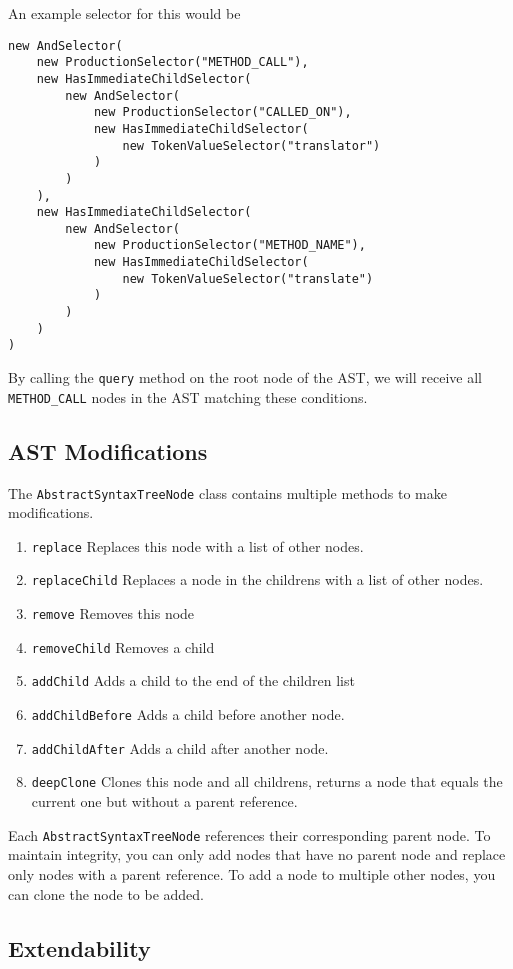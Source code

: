 An example selector for this would be

\begin{verbatim}
new AndSelector(
	new ProductionSelector("METHOD_CALL"),
	new HasImmediateChildSelector(
		new AndSelector(
			new ProductionSelector("CALLED_ON"),
			new HasImmediateChildSelector(
				new TokenValueSelector("translator")
			)
		)
	),
	new HasImmediateChildSelector(
		new AndSelector(
			new ProductionSelector("METHOD_NAME"),
			new HasImmediateChildSelector(
				new TokenValueSelector("translate")
			)
		)
	)
)
\end{verbatim}

By calling the \verb|query| method on the root node of the AST, we will receive all \verb|METHOD_CALL| nodes in the AST matching these conditions.

\subsection{AST Modifications}

The \verb|AbstractSyntaxTreeNode| class contains multiple methods to make modifications.

\begin{enumerate}
\item \verb|replace|  Replaces this node with a list of other nodes.
\item \verb|replaceChild|  Replaces a node in the childrens with a list of other nodes.
\item \verb|remove| Removes this node
\item \verb|removeChild| Removes a child
\item \verb|addChild| Adds a child to the end of the children list
\item \verb|addChildBefore| Adds a child before another node.
\item \verb|addChildAfter| Adds a child after another node.
\item \verb|deepClone| Clones this node and all childrens, returns a node that equals the current one but without a parent reference.
\end{enumerate}

Each \verb|AbstractSyntaxTreeNode| references their corresponding parent node. To maintain integrity, you can only add nodes that have no parent node and replace only nodes with a parent reference. To add a node to multiple other nodes, you can clone the node to be added.

\subsection{Extendability}

